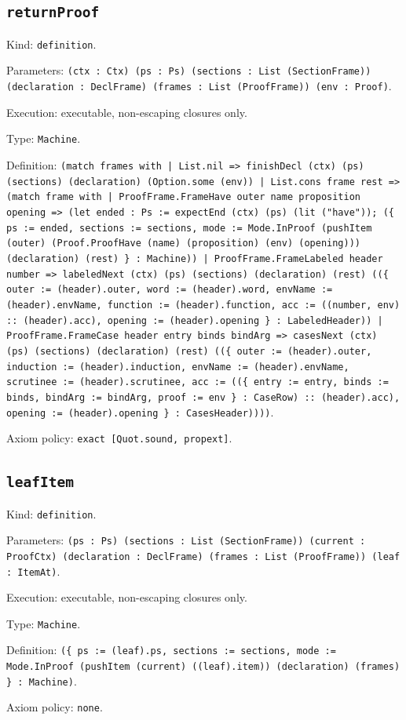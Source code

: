 \documentclass[11pt]{article}
\begin{document}
\subsection*{\texttt{returnProof}}
\noindent Kind: \texttt{definition}.\par
\noindent Parameters: \texttt{(ctx : Ctx) (ps : Ps) (sections : List (SectionFrame)) (declaration : DeclFrame) (frames : List (ProofFrame)) (env : Proof)}.\par
\noindent Execution: executable, non-escaping closures only.\par
\noindent Type: \texttt{Machine}.\par
\noindent Definition: \texttt{(match frames with | List.nil => finishDecl (ctx) (ps) (sections) (declaration) (Option.some (env)) | List.cons frame rest => (match frame with | ProofFrame.FrameHave outer name proposition opening => (let ended : Ps := expectEnd (ctx) (ps) (lit ("have")); (\{ ps := ended, sections := sections, mode := Mode.InProof (pushItem (outer) (Proof.ProofHave (name) (proposition) (env) (opening))) (declaration) (rest) \} : Machine)) | ProofFrame.FrameLabeled header number => labeledNext (ctx) (ps) (sections) (declaration) (rest) ((\{ outer := (header).outer, word := (header).word, envName := (header).envName, function := (header).function, acc := ((number, env) :: (header).acc), opening := (header).opening \} : LabeledHeader)) | ProofFrame.FrameCase header entry binds bindArg => casesNext (ctx) (ps) (sections) (declaration) (rest) ((\{ outer := (header).outer, induction := (header).induction, envName := (header).envName, scrutinee := (header).scrutinee, acc := ((\{ entry := entry, binds := binds, bindArg := bindArg, proof := env \} : CaseRow) :: (header).acc), opening := (header).opening \} : CasesHeader))))}.\par
\noindent Axiom policy: \texttt{exact [Quot.sound, propext]}.\par
\subsection*{\texttt{leafItem}}
\noindent Kind: \texttt{definition}.\par
\noindent Parameters: \texttt{(ps : Ps) (sections : List (SectionFrame)) (current : ProofCtx) (declaration : DeclFrame) (frames : List (ProofFrame)) (leaf : ItemAt)}.\par
\noindent Execution: executable, non-escaping closures only.\par
\noindent Type: \texttt{Machine}.\par
\noindent Definition: \texttt{(\{ ps := (leaf).ps, sections := sections, mode := Mode.InProof (pushItem (current) ((leaf).item)) (declaration) (frames) \} : Machine)}.\par
\noindent Axiom policy: \texttt{none}.\par
\end{document}

